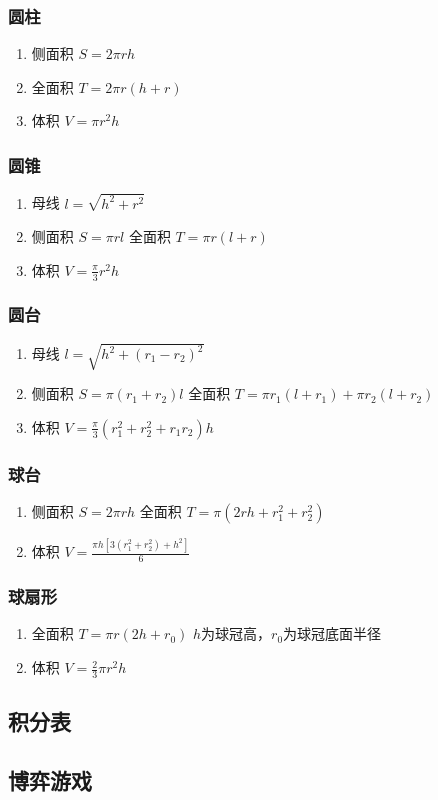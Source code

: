 \documentclass[landscape,twocolumn,a4paper]{article}
\begin{document}
	\subsubsection*{圆柱}

	\begin{enumerate}
		\item 侧面积
		$S=2\pi rh$
		\item 全面积
		$T=2\pi r(h+r)$
		\item 体积
		$V=\pi r^2h$
	\end{enumerate}

	\subsubsection*{圆锥}

	\begin{enumerate}
		\item 母线
		$l=\sqrt{h^2+r^2}$
		\item 侧面积
		$S=\pi rl$    全面积
		$T=\pi r(l+r)$
		\item 体积
		$V=\frac{\pi}{3} r^2h$
	\end{enumerate}

	\subsubsection*{圆台}

	\begin{enumerate}
		\item 母线
		$l=\sqrt{h^2+(r_1-r_2)^2}$
		\item 侧面积
		$S=\pi(r_1+r_2)l$    全面积
		$T=\pi r_1(l+r_1)+\pi r_2(l+r_2)$
		\item 体积
		$V=\frac{\pi}{3}(r_1^2+r_2^2+r_1r_2)h$
	\end{enumerate}

	\subsubsection*{球台}

	\begin{enumerate}
		\item 侧面积
		$S=2\pi rh$   全面积
		$T=\pi(2rh+r_1^2+r_2^2)$
		\item 体积
		$V=\frac{\pi h[3(r_1^2+r_2^2)+h^2]}{6}$
	\end{enumerate}

	\subsubsection*{球扇形}

	\begin{enumerate}
		\item 全面积
		$T=\pi r(2h+r_0)$
		$h$为球冠高，$r_0$为球冠底面半径
		\item 体积
		$V=\frac{2}{3}\pi r^2h$
	\end{enumerate}

	\subsection{积分表}
	

	\subsection{博弈游戏}
	
\end{document}
